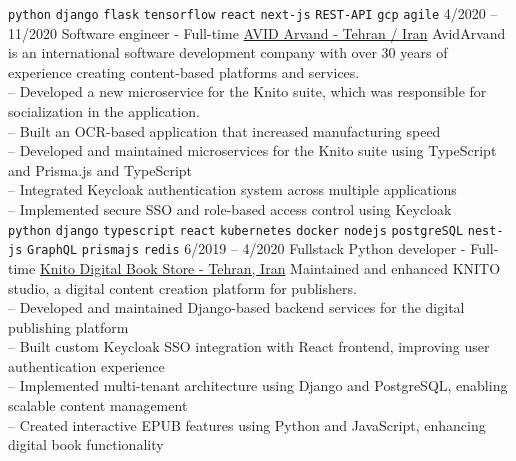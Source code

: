 \begin{entrylist}
{        \texttt{python}\slashsep
        \texttt{django}\slashsep
        \texttt{flask}\slashsep
        \texttt{tensorflow}\slashsep
        \texttt{react}\slashsep
        \texttt{next-js}\slashsep
        \texttt{REST-API}\slashsep
        \texttt{gcp}\slashsep
        \texttt{agile}\slashsep
    }
    \entry
    {4/2020 -- 11/2020}
    {Software engineer - Full-time}
    {
        \href{https://www.linkedin.com/company/avid-technology-development/}{AVID Arvand - Tehran / Iran}}
    {
        AvidArvand is an international software development company with over 30 years of experience creating content-based platforms and services. \\
        -- Developed a new microservice for the Knito suite, which was responsible for socialization in the application.\\
        -- Built an OCR-based application that increased manufacturing speed \\
        -- Developed and maintained microservices for the Knito suite using TypeScript and Prisma.js and TypeScript \\
        -- Integrated Keycloak authentication system across multiple applications \\
        -- Implemented secure SSO and role-based access control using Keycloak \\
        \texttt{python}\slashsep
        \texttt{django}\slashsep
        \texttt{typescript}\slashsep
        \texttt{react}\slashsep
        \texttt{kubernetes}\slashsep
        \texttt{docker}\slashsep
        \texttt{nodejs}\slashsep
        \texttt{postgreSQL}\slashsep
        \texttt{nest-js}\slashsep
        \texttt{GraphQL}\slashsep
        \texttt{prismajs}\slashsep
        \texttt{redis}\slashsep
    }
    \entry
    {6/2019 -- 4/2020}
    {Fullstack Python developer - Full-time}
    {
        \href{https://knito.com/}{Knito Digital Book Store - Tehran, Iran}}
    {
        Maintained and enhanced KNITO studio, a digital content creation platform for publishers. \\
        -- Developed and maintained Django-based backend services for the digital publishing platform \\
        -- Built custom Keycloak SSO integration with React frontend, improving user authentication experience \\
        -- Implemented multi-tenant architecture using Django and PostgreSQL, enabling scalable content management \\
        -- Created interactive EPUB features using Python and JavaScript, enhancing digital book functionality \\
}
\end{entrylist}
